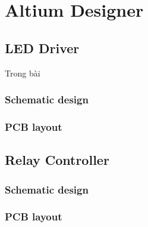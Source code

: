 \section{Altium Designer}
\subsection{LED Driver}
Trong bài 
\subsubsection{Schematic design}
\subsubsection{PCB layout}
\subsection{Relay Controller}
\subsubsection{Schematic design}
\subsubsection{PCB layout}
